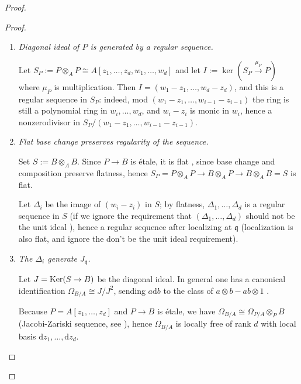\begin{proof}
\begin{proof}
        \begin{enumerate}
            \item \emph{Diagonal ideal of $P$ is generated by a regular sequence.}

                  Let $S_P:=P\otimes_A P\cong A[z_1,\dots,z_d,w_1,\dots,w_d]$ and let $I:=\ker(S_P\xrightarrow{\mu_P} P)$ where $\mu_P$ is multiplication. Then $I=(w_1-z_1,\dots,w_d-z_d)$,
                  and this is a regular sequence in $S_P$: indeed, mod $(w_1-z_1,\dots,w_{i-1}-z_{i-1})$ the ring is still a polynomial ring in $w_i,\dots,w_d$, and $w_i-z_i$ is monic in $w_i$,
                  hence a nonzerodivisor in $S_P/(w_1-z_1,\dots,w_{i-1}-z_{i-1})$.

            \item \emph{Flat base change preserves regularity of the sequence.}

                  Set $S:=B\otimes_A B$. Since $P\to B$ is étale, it is flat \cite[\href{https://stacks.math.columbia.edu/tag/00U2}{Tag 00U2}]{stacks-project}, since base change and composition preserve flatness,
                  hence $S_P = P\otimes_A P\to B\otimes_A P \to B\otimes_A B = S$ is flat.

                  Let $\Delta_i$ be the image of $(w_i-z_i)$ in $S$;
                  by flatness, $\Delta_1,\dots,\Delta_d$ is a regular sequence in $S$ (if we ignore the requirement that $(\Delta_1,\dots,\Delta_d)$ should not be the unit ideal \cite[\href{https://stacks.math.columbia.edu/tag/00LF}{Tag 00LF}]{stacks-project}),
                  hence a regular sequence after localizing at $\mathfrak q$ (localization is also flat, and ignore the don't be the unit ideal requirement).

            \item \emph{The $\Delta_i$ generate $J_{\mathfrak q}$.}

                  Let $J=\operatorname{Ker}(S\to B)$ be the diagonal ideal.
                  In general one has a canonical identification $\Omega_{B/A}\cong J/J^2$,
                  sending $a\mathrm{d}b$ to the class of $a\otimes b-ab\otimes 1$ \cite[\href{https://stacks.math.columbia.edu/tag/00RW}{Tag 00RW}]{stacks-project}.

                  Because $P=A[z_1,\dots,z_d]$ and $P\to B$ is étale, we have $\Omega_{B/A}\cong \Omega_{P/A}\otimes_P B$ (Jacobi-Zariski sequence, see \cite[\href{https://stacks.math.columbia.edu/tag/00RW}{Tag 00RW}, \href{https://stacks.math.columbia.edu/tag/00U1}{Tag 00U1}, \href{https://stacks.math.columbia.edu/tag/08RB}{Tag 08RB}]{stacks-project}),
                  hence $\Omega_{B/A}$ is locally free of rank $d$ with local basis $\mathrm{d}z_1,\dots,\mathrm{d}z_d$.


\end{enumerate}
\end{proof}
\end{proof}
